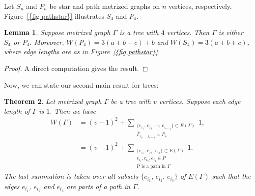 \documentclass[12pt]{amsart}
\newtheorem{theorem}{Theorem}[section]
\newtheorem{lemma}[theorem]{Lemma}
\theoremstyle{example}
\theoremstyle{definition}
\theoremstyle{notation}
\begin{document}
Let $S_n$ and $P_n$ be star and path metrized graphs on $n$ vertices, respectively. {Figure~\ref{{fig pathstar}}} illustrates $S_4$ and $P_4$.
\begin{lemma}\label{lem wiener for v=4}
Suppose metrized graph ${\Gamma}$ is a tree with $4$ vertices. Then ${\Gamma}$ is either $S_4$ or $P_4$.
Moreover, $W(P_4)=3(a+b+c)+b$ and $W(S_4)=3(a+b+c)$, where edge lengths are as in {Figure~\ref{{fig pathstar}}}.
\end{lemma}
\begin{proof}
A direct computation gives the result.
\end{proof}

Now, we can state our second main result for trees:
\begin{theorem}\label{thm main3 for tree}
Let metrized graph ${\Gamma}$ be a tree with $v$ vertices. Suppose each edge length of ${\Gamma}$ is $1$. Then we have
\begin{equation*}
\begin{split}
W({\Gamma}) &= (v-1)^2+\sum_{\substack{\{ e_{i_1}, \, e_{i_2}, \, \cdots, \,  e_{i_{v-4}} \} \subset {E({\Gamma})} \\
{{\overline{\Gamma}}}_{i_1,\dots, i_{v-4}}=P_4}} 1,\\
&= (v-1)^2+\sum_{\substack{\{ e_{i_1}, \, e_{i_2}, \, e_{i_3} \} \subset {E({\Gamma})} \\
e_{i_1}, e_{i_2}, e_{i_3} \in P \\ \text{P is a path in ${\Gamma}$}}} 1.
\end{split}
\end{equation*}
The last summation is taken over all subsets $\{ e_{i_1}, \, e_{i_2}, \, e_{i_3} \}$ of ${E({\Gamma})}$ such that the edges $e_{i_1}$, $e_{i_2}$ and $e_{i_3}$ are parts of a path in ${\Gamma}$.
\end{theorem}
\end{document}
